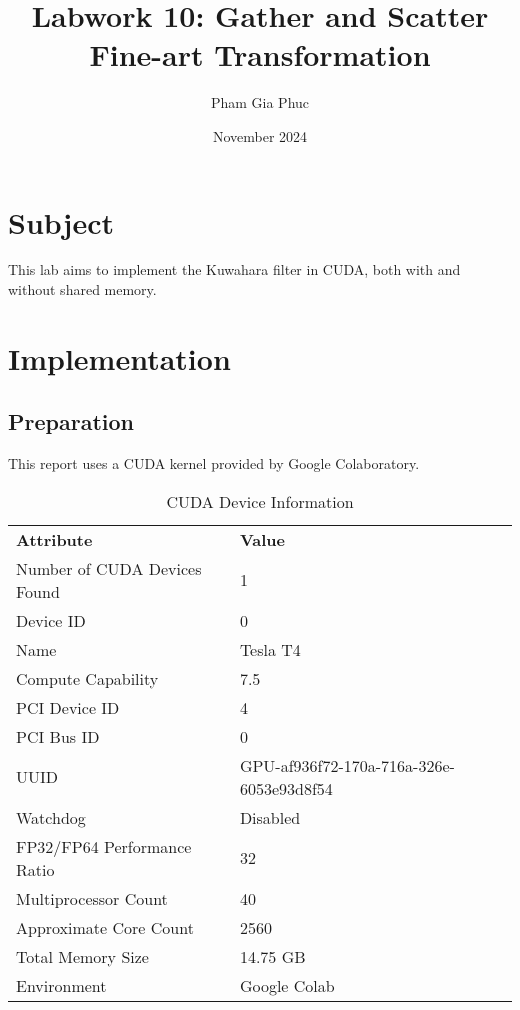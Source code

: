 \documentclass{article}
\title{Labwork 10: Gather and Scatter\\Fine-art Transformation}
\author{Pham Gia Phuc}
\date{November 2024}
\begin{document}
\maketitle

\setlength\parindent{0pt}

\section{Subject}
This lab aims to implement the Kuwahara filter in CUDA, both with and without shared memory.

\section{Implementation}

    \subsection{Preparation}
    This report uses a CUDA kernel provided by Google Colaboratory.

    \begin{table}[ht]
        \centering
        \begin{tabular}{@{}ll@{}}
            \textbf{Attribute} & \textbf{Value} \\
            Number of CUDA Devices Found & 1 \\
            Device ID & 0 \\
            Name & Tesla T4 \\
            Compute Capability & 7.5 \\
            PCI Device ID & 4 \\
            PCI Bus ID & 0 \\
            UUID & GPU-af936f72-170a-716a-326e-6053e93d8f54 \\
            Watchdog & Disabled \\
            FP32/FP64 Performance Ratio & 32 \\
            Multiprocessor Count & 40 \\
            Approximate Core Count & 2560 \\
            Total Memory Size & 14.75 GB \\
            Environment & Google Colab \\ 
        \end{tabular}
        \caption{CUDA Device Information}
        \label{tab:cuda_device_info}
    \end{table}
\end{document}
